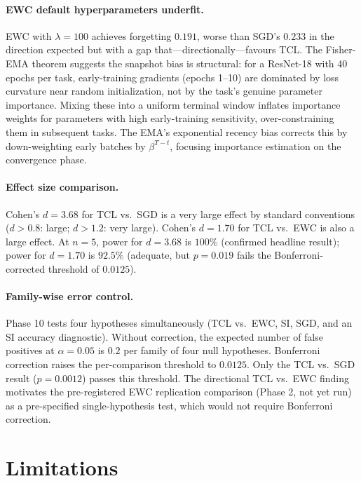 \documentclass[10pt,letterpaper]{article}
\newcommand{\TCL}{\textsc{TCL}}
\newcommand{\EWC}{\textsc{EWC}}
\newcommand{\SGD}{\textsc{SGD}}
\begin{document}
\paragraph{EWC default hyperparameters underfit.}
\EWC{} with $\lambda{=}100$ achieves forgetting $0.191$, worse than \SGD{}'s
$0.233$ in the direction expected but with a gap that---directionally---favours
\TCL{}.
The Fisher-EMA theorem suggests the snapshot bias is structural:
for a ResNet-18 with 40 epochs per task, early-training gradients (epochs 1--10)
are dominated by loss curvature near random initialization, not by the task's
genuine parameter importance.
Mixing these into a uniform terminal window inflates importance weights for
parameters with high early-training sensitivity, over-constraining them in
subsequent tasks.
The EMA's exponential recency bias corrects this by down-weighting early batches
by $\beta^{T-t}$, focusing importance estimation on the convergence phase.

\paragraph{Effect size comparison.}
Cohen's $d{=}3.68$ for \TCL{} vs.\ \SGD{} is a very large effect by standard
conventions ($d > 0.8$: large; $d > 1.2$: very large).
Cohen's $d{=}1.70$ for \TCL{} vs.\ \EWC{} is also a large effect.
At $n{=}5$, power for $d{=}3.68$ is $100\%$ (confirmed headline result);
power for $d{=}1.70$ is $92.5\%$ (adequate, but $p{=}0.019$ fails
the Bonferroni-corrected threshold of $0.0125$).

\paragraph{Family-wise error control.}
Phase 10 tests four hypotheses simultaneously
(TCL vs.\ EWC, SI, SGD, and an SI accuracy diagnostic).
Without correction, the expected number of false positives at $\alpha{=}0.05$
is $0.2$ per family of four null hypotheses.
Bonferroni correction raises the per-comparison threshold to $0.0125$.
Only the TCL vs.\ SGD result ($p{=}0.0012$) passes this threshold.
The directional TCL vs.\ EWC finding motivates the pre-registered EWC replication
comparison (Phase 2, not yet run) as a pre-specified single-hypothesis test,
which would not require Bonferroni correction.

\section{Limitations}
\label{sec:limitations}
\end{document}
